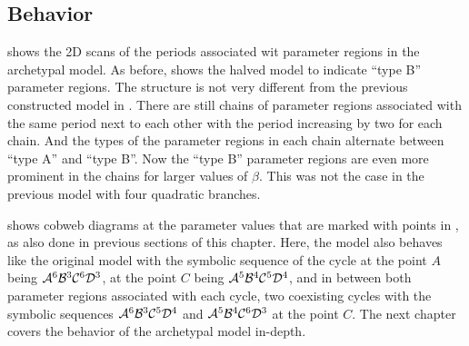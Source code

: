 \subsection{Behavior}
\label{sec:setup.arch.behavior}

 shows the 2D scans of the periods associated wit parameter regions in the archetypal model.
As before,  shows the halved model to indicate ``type B'' parameter regions.
The structure is not very different from the previous constructed model in .
There are still chains of parameter regions associated with the same period next to each other with the period increasing by two for each chain.
And the types of the parameter regions in each chain alternate between ``type A'' and ``type B''.
Now the ``type B'' parameter regions are even more prominent in the chains for larger values of $\beta$.
This was not the case in the previous model with four quadratic branches.

 shows cobweb diagrams at the parameter values that are marked with points in , as also done in previous sections of this chapter.
Here, the model also behaves like the original model with the symbolic sequence of the cycle at the point $A$ being $\mathcal{A}^6\mathcal{B}^3\mathcal{C}^6\mathcal{D}^3$, at the point $C$ being $\mathcal{A}^5\mathcal{B}^4\mathcal{C}^5\mathcal{D}^4$, and in between both parameter regions associated with each cycle, two coexisting cycles with the symbolic sequences $\mathcal{A}^6\mathcal{B}^3\mathcal{C}^5\mathcal{D}^4$ and $\mathcal{A}^5\mathcal{B}^4\mathcal{C}^6\mathcal{D}^3$ at the point $C$.
The next chapter covers the behavior of the archetypal model in-depth.

